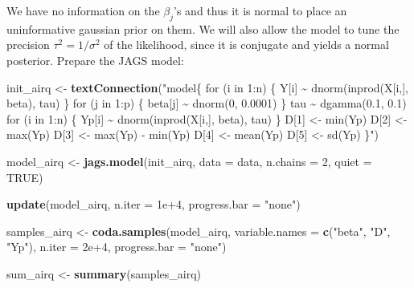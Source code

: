 \documentclass[
]{article}
\newenvironment{Shaded}{\begin{snugshade}}{\end{snugshade}}
\newcommand{\AttributeTok}[1]{\textcolor[rgb]{0.13,0.29,0.53}{#1}}
\newcommand{\ConstantTok}[1]{\textcolor[rgb]{0.56,0.35,0.01}{#1}}
\newcommand{\DecValTok}[1]{\textcolor[rgb]{0.00,0.00,0.81}{#1}}
\newcommand{\FloatTok}[1]{\textcolor[rgb]{0.00,0.00,0.81}{#1}}
\newcommand{\FunctionTok}[1]{\textcolor[rgb]{0.13,0.29,0.53}{\textbf{#1}}}
\newcommand{\NormalTok}[1]{#1}
\newcommand{\OtherTok}[1]{\textcolor[rgb]{0.56,0.35,0.01}{#1}}
\newcommand{\StringTok}[1]{\textcolor[rgb]{0.31,0.60,0.02}{#1}}
\begin{document}
We have no information on the \(\beta_j\)'s and thus it is normal to
place an uninformative gaussian prior on them. We will also allow the
model to tune the precision \(\tau^2 = 1/\sigma^2\) of the likelihood,
since it is conjugate and yields a normal posterior. Prepare the JAGS
model:

\begin{Shaded}
\begin{Highlighting}[]
\NormalTok{init\_airq }\OtherTok{\textless{}{-}} \FunctionTok{textConnection}\NormalTok{(}\StringTok{"model\{}
\StringTok{  for (i in 1:n) \{}
\StringTok{    Y[i] \textasciitilde{} dnorm(inprod(X[i,], beta), tau)}
\StringTok{  \}}
\StringTok{  }
\StringTok{  for (j in 1:p) \{}
\StringTok{    beta[j] \textasciitilde{} dnorm(0, 0.0001)}
\StringTok{  \}}
\StringTok{  }
\StringTok{  tau \textasciitilde{} dgamma(0.1, 0.1)}
\StringTok{  }
\StringTok{  for (i in 1:n) \{}
\StringTok{    Yp[i] \textasciitilde{} dnorm(inprod(X[i,], beta), tau)}
\StringTok{  \}}
\StringTok{  }
\StringTok{  D[1] \textless{}{-} min(Yp)}
\StringTok{  D[2] \textless{}{-} max(Yp)}
\StringTok{  D[3] \textless{}{-} max(Yp) {-} min(Yp)}
\StringTok{  D[4] \textless{}{-} mean(Yp)}
\StringTok{  D[5] \textless{}{-} sd(Yp)}
\StringTok{\}"}\NormalTok{)}

\NormalTok{model\_airq }\OtherTok{\textless{}{-}} \FunctionTok{jags.model}\NormalTok{(init\_airq, }\AttributeTok{data =}\NormalTok{ data, }\AttributeTok{n.chains =} \DecValTok{2}\NormalTok{,}
                         \AttributeTok{quiet =} \ConstantTok{TRUE}\NormalTok{)}

\FunctionTok{update}\NormalTok{(model\_airq, }\AttributeTok{n.iter =} \FloatTok{1e+4}\NormalTok{, }\AttributeTok{progress.bar =} \StringTok{"none"}\NormalTok{)}

\NormalTok{samples\_airq }\OtherTok{\textless{}{-}} \FunctionTok{coda.samples}\NormalTok{(model\_airq, }\AttributeTok{variable.names =} \FunctionTok{c}\NormalTok{(}\StringTok{"beta"}\NormalTok{, }\StringTok{"D"}\NormalTok{, }\StringTok{"Yp"}\NormalTok{),}
                             \AttributeTok{n.iter =} \FloatTok{2e+4}\NormalTok{, }\AttributeTok{progress.bar =} \StringTok{"none"}\NormalTok{)}

\NormalTok{sum\_airq }\OtherTok{\textless{}{-}} \FunctionTok{summary}\NormalTok{(samples\_airq)}


\end{Highlighting}
\end{Shaded}
\end{document}
